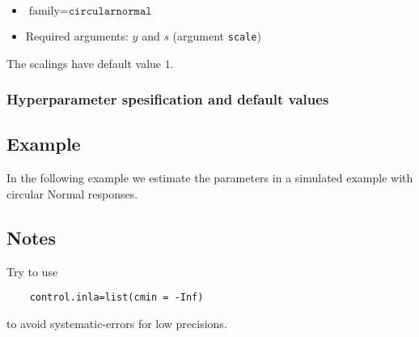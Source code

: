 \documentclass[a4paper,11pt]{article}
\begin{document}
\begin{itemize}
\item $\text{family}=\texttt{circularnormal}$
\item Required arguments: $y$ and $s$ (argument \texttt{scale})
\end{itemize}
The scalings have default value $1$.

\subsubsection*{Hyperparameter spesification and default values}


\subsection*{Example}

In the following example we estimate the parameters in a simulated
example with circular Normal responses.


\subsection*{Notes}

Try to use
\begin{verbatim}
    control.inla=list(cmin = -Inf)
\end{verbatim}
to avoid systematic-errors for low precisions.
\end{document}
